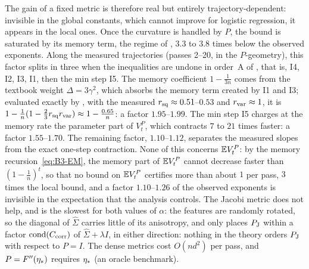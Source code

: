 The gain of a fixed metric is therefore real but entirely trajectory-dependent: invisible in the global constants, which
cannot improve for logistic regression, it appears in the local ones. Once the curvature is handled by $P$, the bound is
saturated by its memory term, the regime of , $3.3$ to $3.8$ times below the observed
exponents. Along the measured trajectories (passes 2--20, in the $P$-geometry), this factor splits in three when the
inequalities are undone in order~A of , that is, I4, I2, I3, I1, then the min step I5. The memory
coefficient $1-\frac1{3n}$ comes from the textbook weight $\Delta=3\gamma^2$, which absorbs the memory term created by I1
and I3; evaluated exactly by , with the measured $r_{\rm sq}\approx0.51$--$0.53$ and
$r_{\rm var}\approx1$, it is $1-\frac1n(1-\frac23r_{\rm sq}r_{\rm var})\approx1-\frac{0.65}n$: a factor $1.95$--$1.99$.
The min step I5 charges at the memory rate the parameter part of $V_t^P$, which contracts $7$ to $21$ times faster: a
factor $1.55$--$1.70$. The remaining factor, $1.10$--$1.12$, separates the measured slopes from the exact one-step
contraction. None of this concerns $\mathbb{E} V_t^P$: by the memory recursion~\eqref{eq:B3-EM}, the memory part of $\mathbb{E} V_t^P$
cannot decrease faster than $(1-\frac1n)^t$, so that no bound on $\mathbb{E} V_t^P$ certifies more than about $1$ per pass, $3$
times the local bound, and a factor $1.10$--$1.26$ of the observed exponents is invisible in the expectation that the
analysis controls. The Jacobi metric does not help, and is the slowest for both values of $\alpha$: the features are
randomly rotated, so the diagonal of $\hat\Sigma$ carries little of its anisotropy, and  only places
$P_{\rm J}$ within a factor $\operatorname{cond}(C_{\rm corr})$ of $\hat\Sigma+\lambda I$, in either direction: nothing in
the theory orders $P_{\rm J}$ with respect to $P=I$. The dense metrics cost $O(nd^2)$ per pass, and $P=F''(\eta_\ast)$
requires $\eta_\ast$ (an oracle benchmark).

